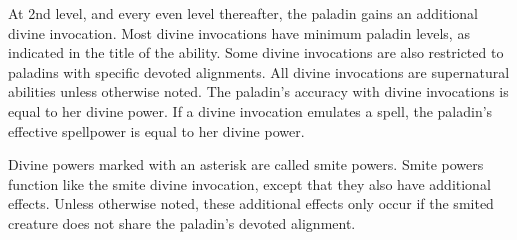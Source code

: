         At 2nd level, and every even level thereafter, the paladin gains an additional divine invocation.
        Most divine invocations have minimum paladin levels, as indicated in the title of the ability.
        Some divine invocations are also restricted to paladins with specific devoted alignments.
        All divine invocations are supernatural abilities unless otherwise noted.
        The paladin's accuracy with divine invocations is equal to her divine power.
        If a divine invocation emulates a spell, the paladin's effective spellpower is equal to her divine power.

        Divine powers marked with an asterisk are called smite powers.
        Smite powers function like the smite divine invocation, except that they also have additional effects.
        Unless otherwise noted, these additional effects only occur if the smited creature does not share the paladin's devoted alignment.


